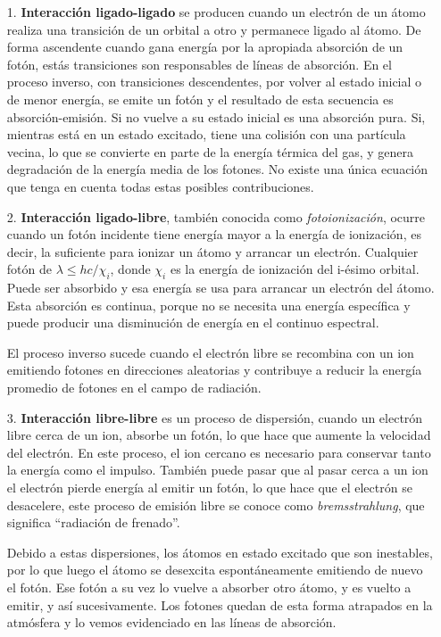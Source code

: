 \documentclass[12pt,oneside,openany,letter]{book}
\begin{document}
\begin{itemize}
    \item[1.] \textbf{Interacción ligado-ligado} se producen cuando un electrón de un átomo realiza una transición de un orbital a otro y permanece ligado al átomo. De forma ascendente cuando gana energía por la apropiada absorción de un fotón, estás transiciones son responsables de líneas de absorción. En el proceso inverso, con transiciones descendentes, por volver al estado inicial o de menor energía, se emite un fotón y el resultado de esta secuencia es absorción-emisión. Si no vuelve a su estado inicial es una absorción pura. Si, mientras está en un estado excitado, tiene una colisión con una partícula vecina, lo que se convierte en parte de la energía térmica del gas, y genera degradación de la energía media de los fotones. No existe una única ecuación que tenga en cuenta todas estas posibles contribuciones.
    
    \item[2.] \textbf{Interacción ligado-libre}, también conocida como \textit{fotoionización}, ocurre cuando un fotón incidente tiene energía mayor a la energía de ionización, es decir, la suficiente para ionizar un átomo y arrancar un electrón. Cualquier fotón de $\lambda \leq hc/\chi_i$, donde $\chi_i$ es la energía de ionización del i-ésimo orbital. Puede ser absorbido y esa energía se usa para arrancar un electrón del átomo. Esta absorción es continua, porque no se necesita una energía específica y puede producir una disminución de energía en el continuo espectral. 
    
    El proceso inverso sucede cuando el electrón libre se recombina con un ion emitiendo fotones en direcciones aleatorias y contribuye a reducir la energía promedio de fotones en el campo de radiación.
    
    \item[3.] \textbf{Interacción libre-libre} es un proceso de dispersión, cuando un electrón libre cerca de un ion, absorbe un fotón, lo que hace que aumente la velocidad del electrón. En este proceso, el ion cercano es necesario para conservar tanto la energía como el impulso. También puede pasar que al pasar cerca a un ion el electrón pierde energía al emitir un fotón, lo que hace que el electrón se desacelere, este proceso de emisión libre se conoce como \textit{bremsstrahlung}, que significa ``radiación de frenado''.
    
    Debido a estas dispersiones, los átomos en estado excitado que son inestables, por lo que luego el átomo se desexcita espontáneamente emitiendo de nuevo el fotón. Ese fotón a su vez lo vuelve a absorber otro átomo, y es vuelto a emitir, y así sucesivamente. Los fotones quedan de esta forma atrapados en la atmósfera y lo vemos evidenciado en las líneas de absorción.
    

\end{itemize}
\end{document}
